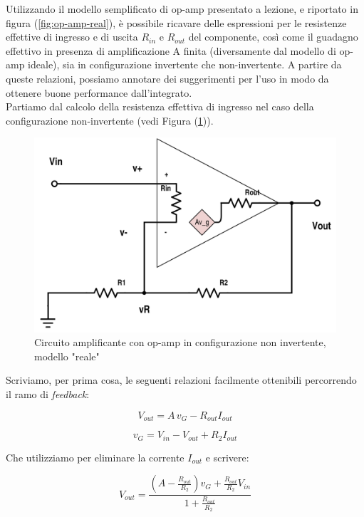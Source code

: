 \documentclass[journal, a4paper]{IEEEtran}
\begin{document}
Utilizzando il modello semplificato di op-amp presentato a lezione, e riportato in figura (\ref{fig:op-amp-real}), è possibile ricavare delle espressioni per le resistenze effettive di ingresso e di uscita $R_{in}$ e $R_{out}$ del componente, così come il guadagno effettivo in presenza di amplificazione A finita (diversamente dal modello di op-amp ideale), sia in configurazione invertente che non-invertente. A partire da queste relazioni, possiamo annotare dei suggerimenti per l'uso in modo da ottenere buone performance dall'integrato.\\

Partiamo dal calcolo della resistenza effettiva di ingresso nel caso della configurazione non-invertente (vedi Figura (\ref{fig:op-amp-non-inv})).

\begin{figure}
\centering
\includegraphics[width=0.9\linewidth]{./op-amp-non-inv}
\caption{Circuito amplificante con op-amp in configurazione non invertente, modello "reale"}
\label{fig:op-amp-non-inv}
\end{figure}


Scriviamo, per prima cosa, le seguenti relazioni facilmente ottenibili percorrendo il ramo di \textit{feedback}:

\begin{equation}
V_{out} = A \, v_G - R_{out}I_{out}
\end{equation} 

\begin{equation}
v_G = V_{in} - V_{out} + R_2 I_{out}
\end{equation}

Che utilizziamo per eliminare la corrente $I_{out}$ e scrivere:

\begin{equation}
V_{out} = \frac{(A-\frac{R_{{out}}}{R_2})v_G + \frac{R_{out}}{R_2}V_{in}}{1 + \frac{R_{out}}{R_2}}
\end{equation}
\end{document}
